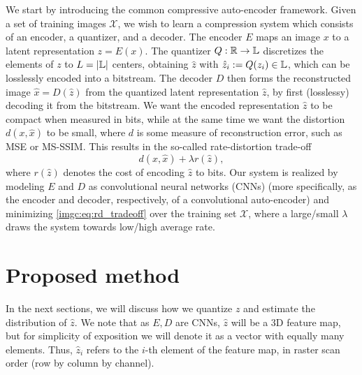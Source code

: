 We start by introducing the common compressive auto-encoder framework.  Given a
set of training images $\mathcal{X}$, we wish to learn a compression system
which consists of an encoder, a quantizer, and a decoder.  The encoder $E$ maps
an image $x$ to a latent representation $z=E(x)$.  The quantizer $Q:\mathbb R \to
\mathbb{L}$ discretizes the elements of $z$ to $L=|\mathbb{L}|$
centers, obtaining $\hat z$ with $\hat{z}_i:=Q(z_i) \in \mathbb{L}$, which
can be losslessly encoded into a bitstream. 
The decoder $D$ then forms the reconstructed image $\hat x=D(\hat z)$ from the quantized latent
representation $\hat z$, by first (losslessy) decoding it from the
bitstream.  We want the encoded representation $\hat z$ to be compact when
measured in bits, while at the same time we want the distortion $d(x,\hat x)$ to be small, where $d$ is some measure of reconstruction error,
such as MSE or MS-SSIM.  This results in the so-called rate-distortion
trade-off
\begin{equation}
d(x,\hat x) + \lambda r(\hat z), \label{imgc:eq:rd_tradeoff}
\end{equation}
where $r(\hat z)$ denotes the cost of encoding $\hat z$ to bits. Our system is
realized by modeling $E$ and $D$ as convolutional neural networks (CNNs) (more
specifically, as the encoder and decoder, respectively, of a convolutional
auto-encoder) and minimizing \eqref{imgc:eq:rd_tradeoff} over the training set
$\mathcal{X}$, where a large/small $\lambda$ draws the system towards low/high
average rate. 

\section{Proposed method}

In the next sections, we will discuss how we quantize $z$ and estimate the distribution of $\hat z$.
We note that as $E,D$ are CNNs, $\hat z$ will be a 3D feature map, but for simplicity of exposition we will denote it as a vector with equally many elements. Thus, $\hat{z}_i$ refers to the $i$-th element of the feature map, in raster scan order (row by column by channel).


